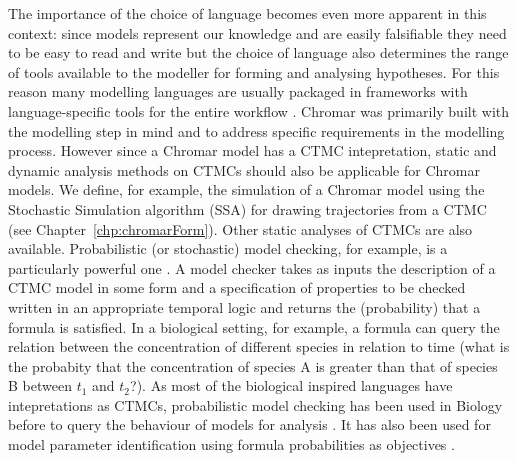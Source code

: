The importance of the choice of language becomes even more apparent in this
context: since models represent our knowledge and are easily falsifiable they
need to be easy to read and write but the choice of language also determines the
range of tools available to the modeller for forming and analysing
hypotheses. For this reason many modelling languages are usually packaged in
frameworks with language-specific tools for the entire workflow
\citep{pradal_openalea:_2008, boutillier2018kappa,
  Calzone_Fages_Soliman_2006}. Chromar was primarily built with the modelling
step in mind and to address specific requirements in the modelling
process. However since a Chromar model has a CTMC intepretation, static and
dynamic analysis methods on CTMCs should also be applicable for Chromar
models. We define, for example, the simulation of a Chromar model using the
Stochastic Simulation algorithm (SSA) for drawing trajectories from a CTMC (see
Chapter~\ref{chp:chromarForm}). Other static analyses of CTMCs are also
available. Probabilistic (or stochastic) model checking, for example, is a
particularly powerful one \cite{Kwiatkowska_Norman_Parker_2007}. A model checker
takes as inputs the description of a CTMC model in some form and a specification
of properties to be checked written in an appropriate temporal logic
\cite{Haverkort_Hermanns_Katoen_Baier_2003, Aziz_Sanwal_Singhal_Brayton_2000}
and returns the (probability) that a formula is satisfied. In a biological
setting, for example, a formula can query the relation between the concentration
of different species in relation to time (\eg what is the probabity that the
concentration of species A is greater than that of species B between $t_1$ and
$t_2$?). As most of the biological inspired languages have intepretations as
CTMCs, probabilistic model checking has been used in Biology before to query the
behaviour of models for analysis \cite{Brim_Češka_Šafránek_2013,
  Heath_Kwiatkowska_Norman_Parker_Tymchyshyn_2008}. It has also been used for
model parameter identification using formula probabilities as objectives
\cite{Barnat_Brim_2012}. %

